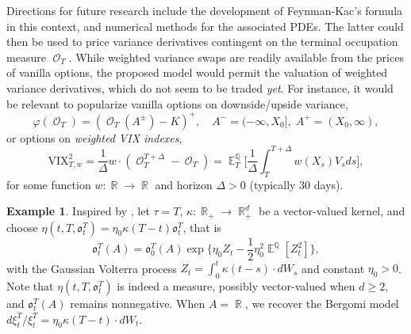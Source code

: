 \documentclass[11pt]{article}
\def\mo{\mathfrak{o}}
\theoremstyle{plain}
\theoremstyle{definition}
\newtheorem{example}{Example}
\DeclareMathOperator{\E}{\mathbb{E}}
\DeclareMathOperator{\Q}{\mathbb{Q}}
\DeclareMathOperator{\R}{\mathbb{R}}
\DeclareMathOperator{\calO}{\mathcal{O}}
\begin{document}
Directions for future research include the development of Feynman-Kac's formula in this context, and  numerical methods for the associated PDEs. The latter could then be used to price variance derivatives contingent on the terminal occupation measure $\calO_T$. While weighted variance swaps are readily available from the prices of vanilla options, the proposed model would permit the valuation of weighted variance derivatives, which do not seem to  be traded \textit{yet}. %
For instance, it would be relevant to  popularize  vanilla options on downside/upside variance,  %
$$\varphi(\calO_T) = (\calO_T(A^{\pm}) - K)^+, \quad A^{-} = (-\infty,X_0],  \;  A^{+} = (X_0,\infty), $$ %
or  options on \textit{weighted VIX indexes},  %
$$\text{VIX}_{T,w}^2 = \frac{1}{\Delta}w\cdot (\calO_T^{T+\Delta}-\calO_T) = \E^{\Q}_T\Big[\frac{1}{\Delta}\int_T^{T+\Delta}w(X_s)V_sds\Big], $$  
for some function $w:\R\to \R$ and horizon $\Delta >0$ (typically $30$ days).




\begin{example}\label{ex:BergomiModels} %
Inspired by  \citet{Bergomi}, let  $\tau = T$, $\kappa:\R_+\to \R_+^d$ be a vector-valued kernel,  and choose 
$\eta(t,T,\mo_t^{T}) = \eta_0 \kappa(T-t)\mo_t^T$, that is 
\begin{equation}
    \mo_t^T(A) = \mo_0^T(A) \exp\big\{\eta_0 Z_t - \frac{1}{2}\eta_0^2\E^{\Q}[Z_t^2]\big\},
\end{equation}
with the Gaussian Volterra process $Z_t = \int_0^t\kappa(t-s)\cdot dW_s $ and constant $\eta_0>0$. Note that $\eta(t,T,\mo_t^{T})$ is indeed a measure, possibly vector-valued when $d\ge 2$, 
and  $\mo_t^T(A)$ remains nonnegative. When $A = \R$, we recover the  Bergomi model $d\xi_t^T / \xi_t^T  = \eta_0 \kappa(T-t) \cdot dW_t$.  %

\end{example}
\end{document}
